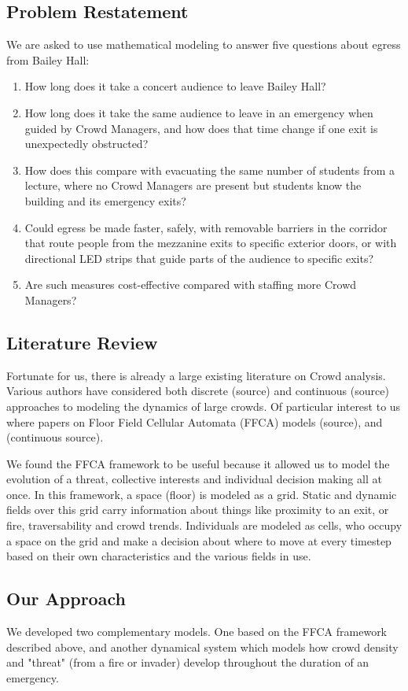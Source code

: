 \documentclass[14pt]{article}
\theoremstyle{definition}
\begin{document}
\subsection{Problem Restatement}
We are asked to use mathematical modeling to answer five questions about egress from
Bailey Hall:
\begin{enumerate}
  \item How long does it take a concert audience to leave Bailey Hall?
  \item How long does it take the same audience to leave in an emergency when guided by
  Crowd Managers, and how does that time change if one exit is unexpectedly obstructed?
  \item How does this compare with evacuating the same number of students from a
  lecture, where no Crowd Managers are present but students know the building and its
  emergency exits?
  \item Could egress be made faster, safely, with removable barriers in the corridor
  that route people from the mezzanine exits to specific exterior doors, or with
  directional LED strips that guide parts of the audience to specific exits?
  \item Are such measures cost-effective compared with staffing more Crowd Managers?
\end{enumerate}

\subsection{Literature Review}
Fortunate for us, there is already a large existing literature on Crowd analysis. Various authors have considered both discrete (source) and continuous (source) approaches to modeling the dynamics of large crowds. Of particular interest to us where papers on Floor Field Cellular Automata (FFCA) models  (source), and (continuous source).

We found the FFCA framework to be useful because it allowed us to model the evolution of a threat, collective interests and individual decision making all at once. In this framework, a space (floor) is modeled as a grid. Static and dynamic fields over this grid carry information about things like proximity to an exit, or fire, traversability and crowd trends. Individuals are modeled as cells, who occupy a space on the grid and make a decision about where to move at every timestep based on their own characteristics and the various fields in use.

\subsection{Our Approach}
We developed two complementary models. One based on the FFCA framework described above, and another dynamical system which models how crowd density and "threat" (from a fire or invader) develop throughout the duration of an emergency.
\end{document}
